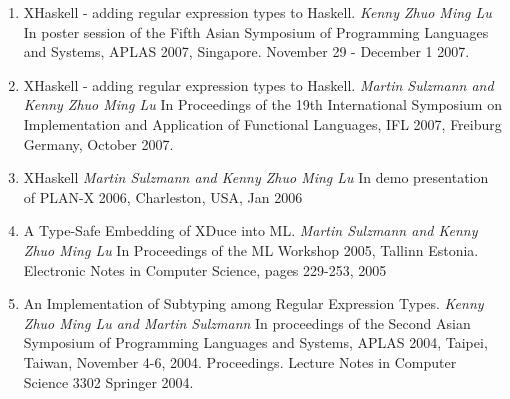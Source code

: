 \documentclass[margin,line]{res}
\newenvironment{list2}{
  \begin{list}{$\bullet$}{%
      \setlength{\itemsep}{0in}
      \setlength{\parsep}{0in} \setlength{\parskip}{0in}
      \setlength{\topsep}{0in} \setlength{\partopsep}{0in} 
      \setlength{\leftmargin}{0.2in}}}{\end{list}}
\newcommand{\longversion}[1]{}
\begin{document}
\begin{resume}
{\begin{enumerate}
\item XHaskell - adding regular expression types to Haskell. \textit{Kenny Zhuo Ming Lu} 
In poster session of the Fifth Asian Symposium of Programming Languages and Systems, APLAS 2007,
Singapore. November 29 - December 1 2007.
\item XHaskell - adding regular expression types to Haskell. \textit{Martin Sulzmann and Kenny Zhuo Ming Lu} 
In Proceedings of the 19th International Symposium on Implementation and Application of Functional Languages, IFL 2007, Freiburg Germany, October 2007.
\item XHaskell \textit{Martin Sulzmann and Kenny Zhuo Ming Lu} 
In demo presentation of PLAN-X 2006, Charleston, USA, Jan 2006
\item A Type-Safe Embedding of XDuce into ML. \textit{Martin Sulzmann and Kenny Zhuo Ming Lu} In Proceedings of
the ML Workshop 2005, Tallinn Estonia. Electronic Notes in Computer Science, pages 229-253, 2005 
\item An Implementation of Subtyping among Regular Expression Types. \textit{Kenny Zhuo Ming Lu and Martin Sulzmann} In proceedings of the Second Asian Symposium of Programming Languages and Systems, APLAS 2004, Taipei, Taiwan, November 4-6, 2004. Proceedings. Lecture Notes in Computer Science 3302 Springer 2004.
\end{enumerate}


\longversion{
{\bf Technical Reports (Selected)}
\begin{enumerate}
\item A Faithful Semantics for Hindley/Milner with Regular Expression Types (Extended Version). \textit{Martin Sulzmann and Kenny Zhuo Ming Lu} 2007 July
\item Type Inference and Compilation for Parametric Regular Data Types. \textit{Martin Sulzmann and Kenny Zhuo Ming Lu} 2006
\item A Type and Semantic Preserving Translation from XDuce to ML. \textit{Martin Sulzmann and Kenny Zhuo Ming Lu 2005}
\item An Implementation of Subtyping among Regular Expression Types. \textit{Kenny Zhuo Ming Lu and Martin Sulzmann} NUS Technical Report (TRB9/04)
\item XHaskell: Regular Expression Types for Haskell. \textit{Kenny Zhuo Ming Lu, Martin Sulzmann} NUS Technical Report (TRC9/04) 
\end{enumerate}



\section{\sc Conference Presentation}
\begin{list2}
\item XHaskell: PLAN-X 2006 demo presentation (collocated with POPL 2006)
\end{list2}
}

}
\end{resume}
\end{document}
